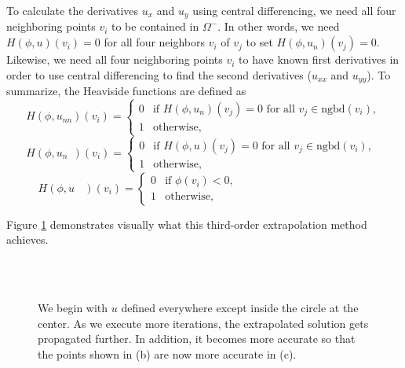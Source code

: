 \documentclass[oneside,12pt,final]{/Applications/TeX/packages/ucthesis-CA2012}
\begin{document}
\begin{mainmatter}
To calculate the derivatives $u_x$ and $u_y$ using central differencing, we need all four neighboring points $v_i$ to be contained in $\Omega^-$. In other words, we need $H(\phi, u)(v_i) = 0$ for all four neighbors $v_i$ of $v_j$ to set $H(\phi, u_n)(v_j) = 0$. Likewise, we need all four neighboring points $v_i$ to have known first derivatives in order to use central differencing to find the second derivatives ($u_{xx}$ and $u_{yy}$). To summarize, the Heaviside functions are defined as
 \begin{equation*}
H(\phi,u_{nn})(v_i) = 
\begin{cases}
    0 & \text{if } H(\phi,u_n)(v_j) = 0 \text{ for all } v_j \in \text{ngbd}(v_i),\\ 
    1 & \text{otherwise},
\end{cases}
\end{equation*}
\begin{equation}
H(\phi,u_n \>\>)(v_i)  = 
\begin{cases}
    0 & \text{if } H(\phi,u)(v_j) = 0 \text{ for all } v_j\in \text{ngbd}(v_i), \>\> \\ 
    1 & \text{otherwise},
\end{cases}
\end{equation}
\vspace{0.1in}
\begin{equation*}
H(\phi,u \>\>\>\>)(v_i) = 
\begin{cases}
    0 & \text{if $\phi(v_i) < 0$}, \>\>\>\>\>\>\>\>\>\>\>\>\>\>\>\>\>\>\>\>\>\>\>\>\>\>\>\>\>\>\>\>\>\>\>\>\>\>\>\>\>\>\>\>\>\>\>\>\>\>\>\>\>\> \\ 
    1 & \text{otherwise},
\end{cases}
\end{equation*}

Figure \ref{fig:extrapolation} demonstrates visually what this third-order extrapolation method achieves. 


\begin{figure} [!h]
\centering
{} \\
\\
  \caption[Third-Order Extrapolation Method]{We begin with $u$ defined everywhere except inside the circle at the center. As we execute more iterations, the extrapolated solution gets propagated further. In addition, it becomes more accurate so that the points shown in (b) are now more accurate in (c).}
  \label{fig:extrapolation}
\end{figure}


\end{mainmatter}
\end{document}
